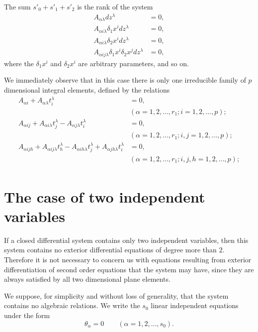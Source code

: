 \documentclass[leqno,11pt]{book}
\numberwithin{equation}{chapter}
\theoremstyle{shape1}
\theoremstyle{shape0}
\theoremstyle{shape2}
\theoremstyle{definition}
\begin{document}
The sum $s'_{0}+s'_{1}+s'_{2}$ is the rank of the system
\begin{align*}
  A_{\alpha\lambda}dz^{\lambda}&=0,\\
  A_{\alpha i \lambda}\delta_{1}x^{i}dz^{\lambda}&=0,\\
  A_{\alpha i \lambda}\delta_{2}x^{i}dz^{\lambda}&=0,\\
  A_{\alpha ij\lambda}\delta_{1}x^{i}\delta_{2}x^{j}dz^{\lambda}&=0,
\end{align*}
where the $\delta_{1}x^{i}$ and $\delta_{2}x^{i}$ are arbitrary parameters, and so on.

We immediately observe that in this case there is only one irreducible family of $p$ dimensional integral elements, defined by the relations
\begin{align*}
  A_{\alpha i}+A_{\alpha\lambda}t_{i}^{\lambda}&=0,\\
  &(\alpha=1,2,\dots,r_{1};i=1,2,\dots,p);\\
  A_{\alpha ij}+A_{\alpha i\lambda}t_{j}^{\lambda}-A_{\alpha j\lambda}t_{i}^{\lambda}&=0,\\
  &(\alpha=1,2,\dots,r_{1};i,j=1,2,\dots,p);\\
  A_{\alpha ijh}+A_{\alpha ij\lambda}t_{h}^{\lambda}-A_{\alpha ih\lambda}t_{j}^{\lambda}+A_{\alpha jh\lambda}t_{i}^{\lambda}&=0,\\
  &(\alpha=1,2,\dots,r_{1};i,j,h=1,2,\dots,p);\\
\end{align*}

\section{The case of two independent variables}
\label{sec:case-two-independent}

\fsec If a closed differential system contains only two independent variables, then this system contains no exterior differential equations of degree more than $2$. Therefore it is not necessary to concern us with equations resulting from exterior differentiation of second order equations that the system may have, since they are always satisfied by all two dimensional plane elements.

We suppose, for simplicity and without loss of generality, that the system contains no algebraic relations. We write the $s_{0}$ linear independent equations under the form
\[
\theta_{\alpha}=0\qquad(\alpha=1,2,\dots,s_{0}).
\]
\end{document}
